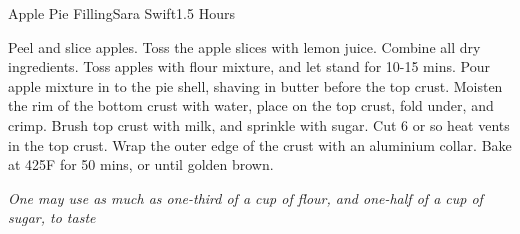 \begin{recipe}{Apple Pie Filling}{Sara Swift}{1.5 Hours}
  
  Peel and slice apples. Toss the apple slices with lemon
  juice. Combine all dry ingredients. Toss apples with flour mixture,
  and let stand for 10-15 mins. Pour apple mixture in to the pie
  shell, shaving in butter before the top crust. Moisten the rim of
  the bottom crust with water, place on the top crust, fold under, and
  crimp. Brush top crust with milk, and sprinkle with sugar. Cut 6 or
  so heat vents in the top crust. Wrap the outer edge of the crust
  with an aluminium collar. Bake at 425\0F for 50 mins, or until
  golden brown.
\end{recipe}
\textit{One may use as much as one-third of a cup of flour, and
  one-half of a cup of sugar, to taste}
